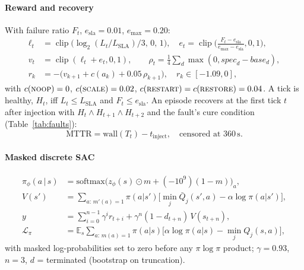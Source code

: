 \documentclass[conference,10pt]{IEEEtran}
\DeclareMathOperator*{\clip}{clip}
\begin{document}
\paragraph*{Reward and recovery}
With failure ratio $F_t$, $e_{\mathrm{sla}}=0.01$, $e_{\max}=0.20$:
\begin{align}
\ell_t &= \clip\big(\log_2(L_t/L_{\mathrm{SLA}})/3,\,0,\,1\big),\quad
e_t = \clip\Big(\tfrac{F_t-e_{\mathrm{sla}}}{e_{\max}-e_{\mathrm{sla}}},0,1\Big),\\
v_t &= \clip(\ell_t+e_t,0,1),\qquad
\rho_t=\tfrac{1}{4}\textstyle\sum_d \max(0,\mathit{spec}_d-\mathit{base}_d),\\
r_k &= -\big(v_{k+1} + c(a_k) + 0.05\,\rho_{k+1}\big),\quad r_k\in[-1.09,0],
\end{align}
with $c(\textsc{noop})=0$, $c(\textsc{scale})=0.02$, $c(\textsc{restart})=c(\textsc{restore})=0.04$.
A tick is healthy, $H_t$, iff $L_t\le L_{\mathrm{SLA}}$ and $F_t\le e_{\mathrm{sla}}$. An episode recovers at the first tick $t$ after injection with $H_t\wedge H_{t+1}\wedge H_{t+2}$ and the fault's cure condition (Table~\ref{tab:faults}):
\begin{equation}
\mathrm{MTTR}=\mathrm{wall}(T_t)-t_{\mathrm{inject}},\quad \text{censored at } 360\,\mathrm{s}.
\end{equation}

\paragraph*{Masked discrete SAC}
\begin{align}
\pi_\phi(a\,|\,s) &= \mathrm{softmax}\big(z_\phi(s)\odot m + (-10^9)(1-m)\big)_a,\\
V(s') &= \textstyle\sum_{a:\,m'(a)=1}\pi(a|s')\big[\min_j \bar Q_j(s',a) - \alpha\log\pi(a|s')\big],\\
y &= \textstyle\sum_{i=0}^{n-1}\gamma^i r_{t+i} + \gamma^n (1-d_{t+n})\,V(s_{t+n}),\\
\mathcal{L}_\pi &= \mathbb{E}_s\textstyle\sum_{a:\,m(a)=1}\pi(a|s)\big[\alpha\log\pi(a|s)-\min_j Q_j(s,a)\big],
\end{align}
with masked log-probabilities set to zero before any $\pi\log\pi$ product; $\gamma=0.93$, $n=3$, $d$ = terminated (bootstrap on truncation).
\end{document}
